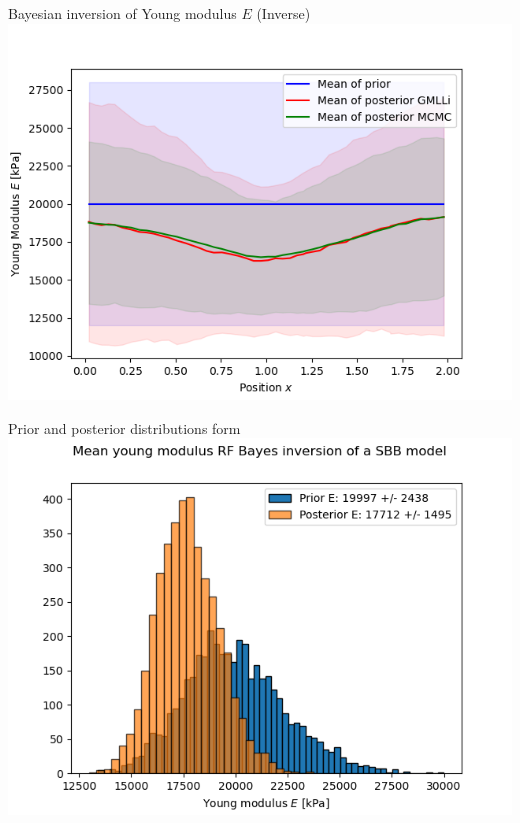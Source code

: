 \documentclass[dvipsnames]{beamer}
\begin{document}
	\begin{frame}{Bayesian inversion of Young modulus $E$ (Inverse)}
	\includegraphics[width=\textwidth, height=0.9\textheight]{graphs/rf_E/young_map.png}
	\end{frame}
	
	\begin{frame}{Prior and posterior distributions form}
	\includegraphics[width=\textwidth, height=0.9\textheight]{graphs/rf_E/young_modulus_hist.png}
	\end{frame}
	
\end{document}
